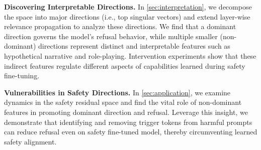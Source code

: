 \textbf{Discovering Interpretable Directions.} In \autoref{sec:interpretation}, we decompose the space into major directions (i.e., top singular vectors) and extend layer-wise relevance propagation \cite{bach2015pixel} to analyze these directions. We find that a dominant direction governs the model's refusal behavior, while multiple smaller (non-dominant) directions represent distinct and interpretable features such as hypothetical narrative and role-playing. Intervention experiments show that these indirect features regulate different aspects of capabilities learned during safety fine-tuning.

\textbf{Vulnerabilities in Safety Directions.} In \autoref{sec:application}, we examine dynamics in the safety residual space and find the vital role of non-dominant features in promoting dominant direction and refusal. Leverage this insight, we demonstrate that identifying and removing trigger tokens from harmful prompts can reduce refusal even on safety fine-tuned model, thereby circumventing learned safety alignment.

% 
